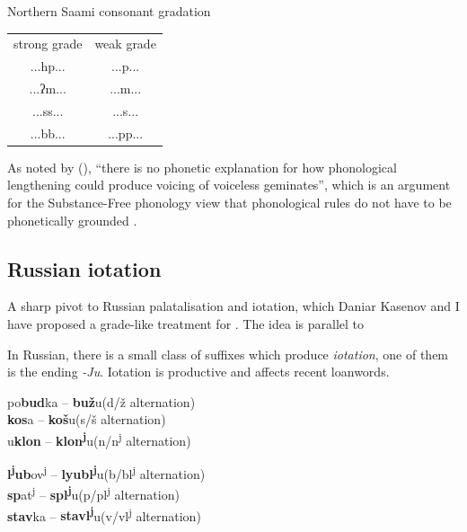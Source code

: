 \documentclass[a4paper, 12pt]{article}
\newcommand{\citeay}[2][]{
   \citeauthor{#2} (\citeyear[#1]{#2})}
\begin{document}
	\ex\label{norsaami}Northern Saami consonant gradation \parencite[p. 19]{balsbaal2007}\\
\begin{tabular}{cc}
strong grade & weak grade \\
...hp...           & ...p...          \\
...ʔm...           & ...m...          \\
...ss...           & ...s...          \\
...bb...           & ...pp...        
\end{tabular}
	\xe
	As noted by \citeay[p. 141]{chabot2021}, ``there is no phonetic explanation for how phonological lengthening could produce voicing of voiceless geminates'', which is an argument for the Substance-Free phonology view that phonological rules do not have to be phonetically grounded \parencite{hale-reiss2008}.
	
			\subsection{Russian iotation}
			
	A sharp pivot to Russian palatalisation and iotation, which Daniar Kasenov and I have proposed a grade-like treatment for \parencite{shikunova-kasenov2023}. The idea is parallel to 
	
	In Russian, there is a small class of suffixes which produce \emph{iotation}, one of them is the {\Fsg} ending \emph{-Ju}. Iotation is productive and affects recent loanwords.
	
\begin{minipage}[t]{0.45\linewidth}
	\ex\label{ex:exes}po\textbf{bud}ka -- \textbf{buž}u\hfill(d/ž alternation)\\
		\textbf{kos}a -- \textbf{koš}u\hfill (s/š alternation)\\
		u\textbf{klon}  -- \textbf{klon\textsuperscript{j}}u\hfill(n/n\textsuperscript{j} alternation)
	\xe
\end{minipage}
\hfill
\begin{minipage}[t]{0.45\linewidth}
	\ex\label{ex:exes-end}\textbf{l\textsuperscript{j}ub}ov\textsuperscript{j} -- \textbf{lyubl\textsuperscript{j}}u\hfill(b/bl\textsuperscript{j}  alternation)\\
		\textbf{sp}at\textsuperscript{j}  -- \textbf{spl\textsuperscript{j}}u\hfill(p/pl\textsuperscript{j}  alternation)\\
		\textbf{stav}ka  -- \textbf{stavl\textsuperscript{j}}u\hfill(v/vl\textsuperscript{j}  alternation)
	\xe
\end{minipage}
\end{document}
